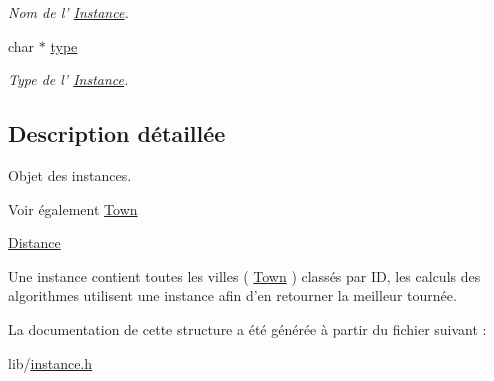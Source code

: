 \begin{DoxyCompactItemize}
\begin{DoxyCompactList}\small\item\em Nom de l' \hyperlink{structInstance}{Instance}. \item\end{DoxyCompactList}\item 
\hypertarget{structInstance_ab4e774f10f1088a089d356fda448f6d1}{
char $\ast$ \hyperlink{structInstance_ab4e774f10f1088a089d356fda448f6d1}{type}}
\label{structInstance_ab4e774f10f1088a089d356fda448f6d1}

\begin{DoxyCompactList}\small\item\em Type de l' \hyperlink{structInstance}{Instance}. \item\end{DoxyCompactList}\end{DoxyCompactItemize}


\subsection{Description détaillée}
Objet des instances. \begin{DoxySeeAlso}{Voir également}
\hyperlink{structTown}{Town} 

\hyperlink{structDistance}{Distance}
\end{DoxySeeAlso}
Une instance contient toutes les villes ( \hyperlink{structTown}{Town} ) classés par ID, les calculs des algorithmes utilisent une instance afin d'en retourner la meilleur tournée. 

La documentation de cette structure a été générée à partir du fichier suivant :\begin{DoxyCompactItemize}
\item 
lib/\hyperlink{instance_8h}{instance.h}\end{DoxyCompactItemize}
